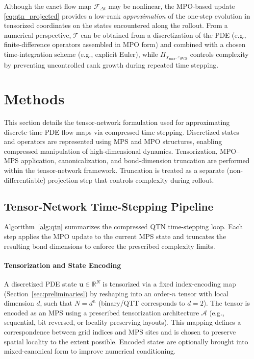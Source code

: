 \documentclass[letterpaper, 10 pt, conference]{ieeeconf}  %
\begin{document}
Although the exact flow map $\mathcal{F}_{\Delta t}$ may be nonlinear, the
MPO-based update \eqref{eq:qtn_projected} provides a low-rank \emph{approximation}
of the one-step evolution in tensorized coordinates on the states encountered
along the rollout. From a numerical perspective, $\mathcal{T}$ can be obtained
from a discretization of the PDE (e.g., finite-difference operators assembled
in MPO form) and combined with a chosen time-integration scheme  (e.g., explicit Euler), while
$\Pi_{\chi_{\max},\varepsilon_{\mathrm{SVD}}}$ controls complexity by preventing uncontrolled
rank growth during repeated time stepping.


\section{Methods} \label{sec:methods}

This section details the tensor-network formulation used for approximating
discrete-time PDE flow maps via compressed time stepping. Discretized states and
operators are represented using MPS and MPO structures, enabling compressed
manipulation of high-dimensional dynamics. Tensorization, MPO--MPS application,
canonicalization, and bond-dimension truncation are performed within the
tensor-network framework. Truncation is treated as a separate
(non-differentiable) projection step that controls complexity during rollout.

\subsection{Tensor-Network Time-Stepping Pipeline}
Algorithm~\ref{alg:qtn} summarizes the compressed QTN time-stepping loop. Each
step applies the MPO update to the current MPS state and truncates the resulting
bond dimensions to enforce the prescribed complexity limits.

\paragraph{Tensorization and State Encoding}
A discretized PDE state $\mathbf{u}\in\mathbb{R}^{N}$ is tensorized via a fixed
index-encoding map (Section~\ref{sec:preliminaries}) by reshaping into an
order-$n$ tensor with local dimension $d$, such that $N=d^{n}$ (binary/QTT
corresponds to $d=2$). The tensor is encoded as an MPS using a prescribed
tensorization architecture $\mathcal{A}$ (e.g., sequential, bit-reversed, or
locality-preserving layouts). This mapping defines a correspondence between
grid indices and MPS sites and is chosen to preserve spatial locality to the
extent possible. Encoded states are optionally brought into mixed-canonical form
to improve numerical conditioning.
\end{document}
